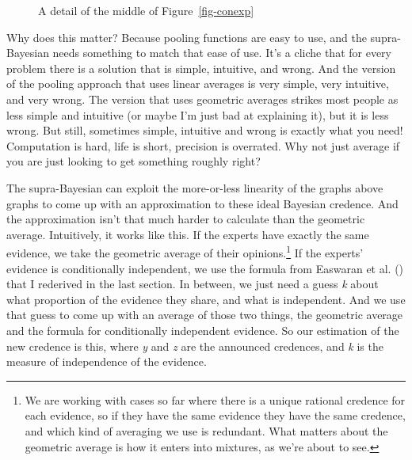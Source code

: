 \documentclass[
  10pt,
  letterpaper,
  DIV=11,
  numbers=noendperiod,
  twoside]{scrartcl}
\begin{document}
\begin{figure}


\caption{\label{fig-cap-middle}A detail of the middle of
Figure~\ref{fig-conexp}}

\end{figure}%

Why does this matter? Because pooling functions are easy to use, and the
supra-Bayesian needs something to match that ease of use. It's a cliche
that for every problem there is a solution that is simple, intuitive,
and wrong. And the version of the pooling approach that uses linear
averages is very simple, very intuitive, and very wrong. The version
that uses geometric averages strikes most people as less simple and
intuitive (or maybe I'm just bad at explaining it), but it is less
wrong. But still, sometimes simple, intuitive and wrong is exactly what
you need! Computation is hard, life is short, precision is overrated.
Why not just average if you are just looking to get something roughly
right?

The supra-Bayesian can exploit the more-or-less linearity of the graphs
above graphs to come up with an approximation to these ideal Bayesian
credence. And the approximation isn't that much harder to calculate than
the geometric average. Intuitively, it works like this. If the experts
have exactly the same evidence, we take the geometric average of their
opinions.\footnote{We are working with cases so far where there is a
  unique rational credence for each evidence, so if they have the same
  evidence they have the same credence, and which kind of averaging we
  use is redundant. What matters about the geometric average is how it
  enters into mixtures, as we're about to see.} If the experts' evidence
is conditionally independent, we use the formula from Easwaran et al.
() that I rederived in the last
section. In between, we just need a guess \emph{k} about what proportion
of the evidence they share, and what is independent. And we use that
guess to come up with an average of those two things, the geometric
average and the formula for conditionally independent evidence. So our
estimation of the new credence is this, where \emph{y} and \emph{z} are
the announced credences, and \emph{k} is the measure of independence of
the evidence.
\end{document}
